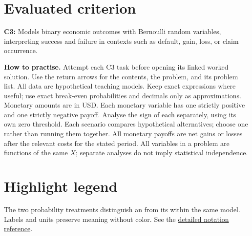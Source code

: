 
\maketitle
\setcounter{tocdepth}{1}
\setcounter{secnumdepth}{2}
\label{toc}
\tableofcontents
\section*{Evaluated criterion}
\textbf{C3:} Models binary economic outcomes with Bernoulli random variables, interpreting success and failure in contexts such as default, gain, loss, or claim occurrence.

\textbf{How to practise.} Attempt each C3 task before opening its linked worked solution.
Use the return arrows for the contents, the problem, and its problem list.
All data are hypothetical teaching models. Keep exact expressions where useful;
use exact break-even probabilities and decimals only as approximations. Monetary amounts are in USD.
Each monetary variable has one strictly positive and one strictly negative payoff.
Analyse the sign of each  separately, using its own zero threshold.
Each scenario compares hypothetical alternatives; choose one rather than running them together.
All monetary payoffs are net gains or losses after the relevant costs for the stated period.
All variables in a problem are functions of the same $X$; separate analyses do
not imply statistical independence.


\clearpage\section*{Highlight legend}
\label{tab:highlight-legend}

The two probability treatments distinguish an  from its  within
the same model. Labels and units preserve meaning without color.
See the \hyperref[tab:notation-reference]{detailed notation reference}.

